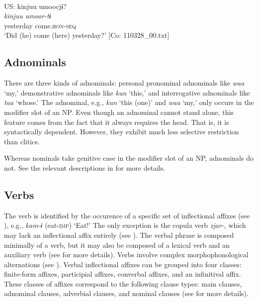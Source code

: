 \ea{} \label{ex:4.48}\\
US: \glll   kinjuu  umoocjɨ?\\
    \textit{kinjuu}  \textit{umoor-tɨ}\\
    yesterday  come.\textsc{hon}-\textsc{seq}\\
  \glt     ‘Did (he) come (here) yesterday?’ [Co: 110328\_00.txt]
\z

\subsection{Adnominals}\label{sec:4.3.2}

There are three kinds of adnominals: personal pronominal adnominals like \textit{waa} ‘my,’ demonstrative adnominals like \textit{kun} ‘this,’ and interrogative adnominals like \textit{taa} ‘whose.’ The adnominal, e.g., \textit{kun} ‘this (one)’ and \textit{waa} ‘my,’ only occurs in the modifier slot of an NP. Even though an adnominal cannot stand alone, this feature comes from the fact that it always requires the head. That is, it is syntactically dependent. However, they exhibit much less selective restriction than clitics. 

Whereas nominals take genitive case in the modifier slot of an NP, adnominals do not. See the relevant descriptions in  for more details.

\subsection{Verbs}\label{sec:4.3.3}

The verb is identified by the occurence of a specific set of inflectional affixes (see ), e.g., \textit{kam-ɨ} (eat-\textsc{imp}) ‘Eat!’ The only exception is the copula verb \textit{zjar-}, which may lack an inflectional affix entirely (see ). The verbal phrase is composed minimally of a verb, but it may also be composed of a lexical verb and an auxiliary verb (see  for more details). Verbs involve complex morphophonological alternations (see ). Verbal inflectional affixes can be grouped into four classes: finite-form affixes, participial affixes, converbal affixes, and an infinitival affix. These classes of affixes correspond to the following clause types: main clauses, adnominal clauses, adverbial clauses, and nominal clauses (see  for more details).

